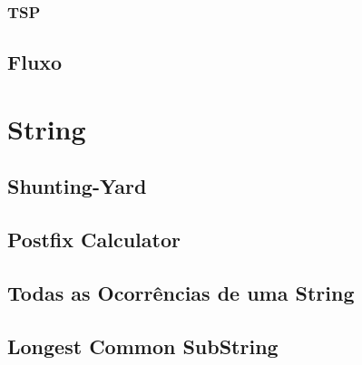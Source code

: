         \subsection{TSP}
            
        
        \newpage
    \section{Fluxo}
\newpage

\chapter{String}
    \section{Shunting-Yard}
        
    \newpage
    \section{Postfix Calculator}
        
    \newpage
    \section{Todas as Ocorrências de uma String}
        
    \section{Longest Common SubString}
        
\newpage

